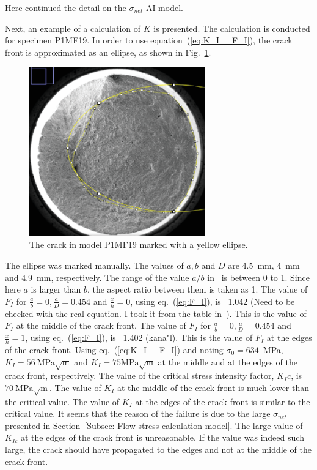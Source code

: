 \documentclass[preprint,12pt]{elsarticle}
\begin{document}
%
%
Here continued the detail on the $\sigma_{net}$ AI model.


Next, an example of a calculation of $K$ is presented.
The calculation is conducted for specimen P1MF19.
In order to use equation~(\ref{eq:K_I__F_I}), the crack front is approximated as an ellipse, as shown in Fig.~\ref{fig:P1MF19_elip_crack}.
%
\begin{figure}[t!]
  \begin{center}
  \includegraphics[width=3in]{P1MF19_elip_crack.eps}
  \caption{The crack in model P1MF19 marked with a yellow ellipse.}
  \label{fig:P1MF19_elip_crack}
   \end{center}
\end{figure}
%
The ellipse was marked manually.
The values of $a, b$ and $D$ are 4.5~mm, 4~mm and 4.9~mm, respectively.
The range of the value $a/b$ in~\cite{shin2004experimental} is between 0 to 1.
Since here $a$ is larger than $b$, the aspect ratio between them is taken as 1.
The value of $F_I$ for $\frac{a}{b}=0, \frac{a}{D}=0.454$ and $\frac{x}{h}=0$, using eq.~(\ref{eq:F_I}), is ~1.042 (Need to be checked with the real equation. I took it from the table in~\cite{shin2004experimental}).
This is the value of $F_I$ at the middle of the crack front.
The value of $F_I$ for $\frac{a}{b}=0, \frac{a}{D}=0.454$ and $\frac{x}{h}=1$, using eq.~(\ref{eq:F_I}), is ~1.402 (kana"l).
This is the value of $F_I$ at the edges of the crack front.
Using eq.~(\ref{eq:K_I__F_I}) and noting $\sigma_0=634$~MPa, $K_I=56~\mbox{MPa}\sqrt{\mbox{m}}$ and $K_I=75\mbox{MPa}\sqrt{\mbox{m}}$ at the middle and at the edges of the crack front, respectively.
The value of the critical stress intensity factor, $K_Ic$, is $70~\mbox{MPa}\sqrt{\mbox{m}}$.
The value of $K_I$ at the middle of the crack front is much lower than the critical value.
The value of $K_I$ at the edges of the crack front is similar to the critical value.
It seems that the reason of the failure is due to the large $\sigma_{net}$ presented in Section~\ref{Subsec: Flow stress calculation model}.
The large value of $K_{Ic}$ at the edges of the crack front is unreasonable.
If the value was indeed such large, the crack should have propagated to the edges and not at the middle of the crack front.
\end{document}
